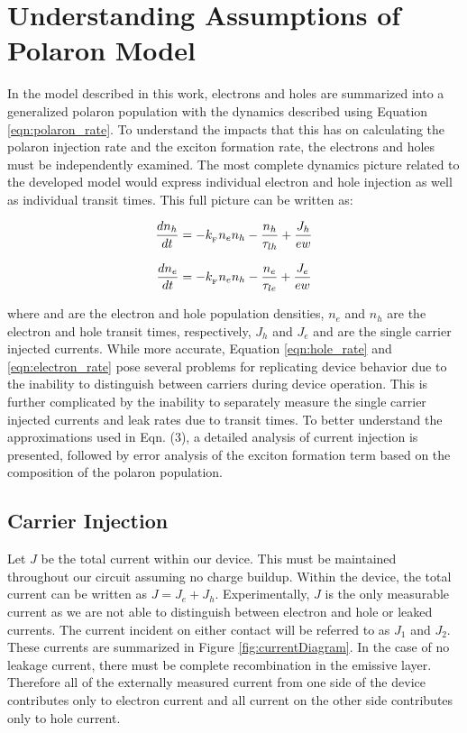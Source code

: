 \documentclass[../thesis.tex]{subfiles}
\begin{document}
\section{Understanding Assumptions of Polaron Model}


In the model described in this work, electrons and holes are summarized into a generalized
polaron population with the dynamics described using Equation \ref{eqn:polaron_rate}. 
To understand the impacts that this has on calculating the polaron injection rate and the exciton formation rate, the electrons and holes must be independently examined. 
The most complete dynamics picture related to the developed model would express individual electron and hole injection as well as individual transit times. This full picture can be written as:

\begin{equation}
\frac{dn_h}{dt}=-k_{_\text{\tiny F}} n_en_h-\frac{n_h}{\tau_{lh}}+\frac{J_h}{ew}
\label{eqn:hole_rate}
\end{equation}

\begin{equation}
\frac{dn_e}{dt}=-k_{_\text{\tiny F}} n_en_h-\frac{n_e}{\tau_{le}}+\frac{J_e}{ew}
\label{eqn:electron_rate}
\end{equation}


where and are the electron and hole population densities, $n_e$ and $n_h$ are the electron and hole
transit times, respectively, $J_h$ and $J_e$ and are the single carrier injected currents. While more
accurate, Equation \ref{eqn:hole_rate} and \ref{eqn:electron_rate} pose several problems for replicating device behavior due to the inability to distinguish between carriers during device operation. 
This is further complicated by the inability to separately measure the single carrier injected currents and leak rates due to transit times. 
To better understand the approximations used in Eqn. (3), a detailed analysis of current injection is presented, followed by error analysis of the exciton formation term based on the composition of the polaron population.

\subsection{Carrier Injection} \label{sec:carrier_injection}


Let $J$ be the total current within our device.  
This must be maintained throughout our circuit assuming no charge buildup. 
Within the device, the total current can be written as $J=J_e+J_h$.  
Experimentally, $J$ is the only measurable current as we are not able to distinguish between electron and hole or leaked currents.  
The current incident on either contact will be referred to as  $J_1$ and $J_2$. 
These currents are summarized in Figure \ref{fig:currentDiagram}.
In the case of no leakage current, there must be complete recombination in the emissive layer.  
Therefore all of the externally measured current from one side of the device contributes only to electron current and all current on the other side contributes only to hole current.
\end{document}
